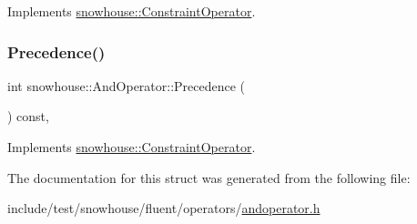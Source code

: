 Implements \mbox{\hyperlink{structsnowhouse_1_1ConstraintOperator_a885882868139127eb8ff3f3ec6a97737}{snowhouse\+::\+Constraint\+Operator}}.

\mbox{\label{structsnowhouse_1_1AndOperator_a791ad296866bdf103cdb7905de1a3e0e}} 
\subsubsection{\texorpdfstring{Precedence()}{Precedence()}}
{\footnotesize\ttfamily int snowhouse\+::\+And\+Operator\+::\+Precedence (\begin{DoxyParamCaption}{ }\end{DoxyParamCaption}) const\hspace{0.3cm}{\ttfamily [inline]}, {\ttfamily [virtual]}}



Implements \mbox{\hyperlink{structsnowhouse_1_1ConstraintOperator_ac7c231c1a9f183c0a2cce8544566eeff}{snowhouse\+::\+Constraint\+Operator}}.



The documentation for this struct was generated from the following file\+:\begin{DoxyCompactItemize}
\item 
include/test/snowhouse/fluent/operators/\mbox{\hyperlink{andoperator_8h}{andoperator.\+h}}\end{DoxyCompactItemize}
